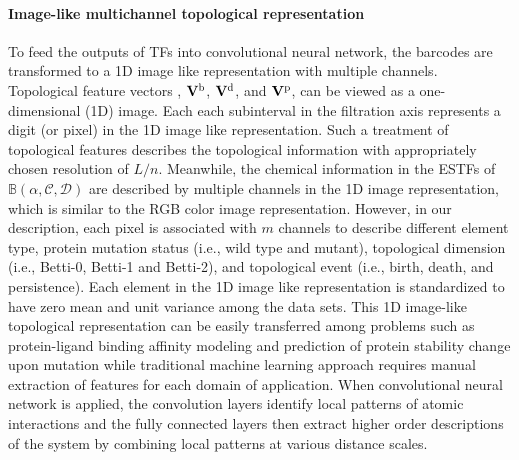 \documentclass[10pt]{article}
\begin{document}
 
\paragraph{Image-like  multichannel topological representation}

To feed the outputs of TFs into convolutional neural network, the barcodes are transformed to a 1D image like representation with multiple channels. Topological feature vectors , $\mathbf{V}^{\rm{b}}$, $\mathbf{V}^{\rm{d}}$, and $\mathbf{V}^{\rm{p}}$, can be viewed as a one-dimensional (1D) image. Each each subinterval in the filtration axis represents a digit (or pixel) in the 1D image like representation. Such a treatment of topological features describes the topological information with appropriately chosen resolution of $L/n$.  Meanwhile, the chemical information in the ESTFs of $\mathbb{B}(\alpha,{\mathcal C},{\mathcal D})$ are described by multiple channels in the 1D image representation, which is similar to the  RGB color image representation. However, in our description, each pixel is associated with $m$ channels to describe different element type, protein mutation status (i.e., wild type and mutant), topological dimension (i.e., Betti-0, Betti-1 and Betti-2), and topological event  (i.e.,  birth, death, and persistence). Each element in the 1D image like representation is standardized to have zero mean and unit variance among the data sets. This 1D image-like topological representation can be easily transferred among problems such as protein-ligand binding affinity modeling and prediction of protein stability change upon mutation while traditional machine learning approach requires manual extraction of features for each domain of application. When convolutional neural network is applied, the convolution layers identify local patterns of atomic interactions and the fully connected layers then extract higher order descriptions of the system by combining local patterns at various distance scales.
\end{document}
